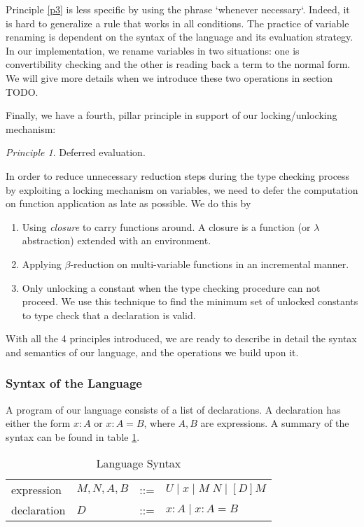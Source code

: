 \documentclass{article}
\theoremstyle{remark}
\newtheorem{principle}{Principle}
\begin{document}
Principle \ref{p3} is less specific by using the phrase `whenever necessary`. Indeed, it is hard to generalize a rule that works in all conditions. The practice of variable renaming is dependent on the syntax of the language and its evaluation strategy. In our implementation, we rename variables in two situations: one is convertibility checking and the other is reading back a term to the normal form. We will give more details when we introduce these two operations in section TODO. 

Finally, we have a fourth, pillar principle in support of our locking/unlocking mechanism:

\begin{principle} \label{p4}
  Deferred evaluation.
\end{principle}

In order to reduce unnecessary reduction steps during the type checking process by exploiting a locking mechanism on variables, we need to defer the computation on function application as late as possible. We do this by
\begin{enumerate}
\item Using \emph{closure} to carry functions around. A closure is a function (or $\lambda$ abstraction) extended with an environment.
\item Applying $\beta$-reduction on multi-variable functions in an incremental manner.
\item Only unlocking a constant when the type checking procedure can not proceed. We use this technique to find the minimum set of unlocked constants to type check that a declaration is valid.
\end{enumerate}

With all the 4 principles introduced, we are ready to describe in detail the syntax and semantics of our language, and the operations we build upon it.

\subsubsection{Syntax of the Language}
A program of our language consists of a list of declarations. A declaration has either the form $x : A$ or $x : A = B$, where $A, B$ are expressions. A summary of the syntax can be found in table \ref{tab:syntax}.

\begin{table}[h]
  \centering
  \begin{tabular}{l l l l}
    expression & $M,N,A,B$ & ::= & $U \mid x \mid M \; N \mid [D] M $ \\
    declaration & $D$ & ::= & $x : A \mid x : A = B$
  \end{tabular}
  \caption{Language Syntax}
  \label{tab:syntax}
\end{table}
\end{document}
